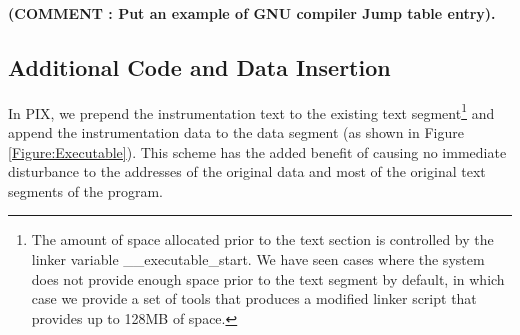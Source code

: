 \textbf{(COMMENT : Put an example of GNU compiler Jump table entry).}

\subsection{Additional Code and Data Insertion}


In PIX, we prepend the instrumentation text to the existing text
segment\footnote{The amount of space allocated prior to the text section is
controlled by the linker variable \_\_executable\_start. We have seen cases
where the system does not provide enough space prior to the text segment by
default, in which case we provide a set of tools that produces a modified linker
script that provides up to 128MB of space.} and append the instrumentation data to the
data segment (as shown in Figure \ref{Figure:Executable}). This
scheme has the added benefit of causing no immediate disturbance to the
addresses of the original data and most of the original text segments of the program.

